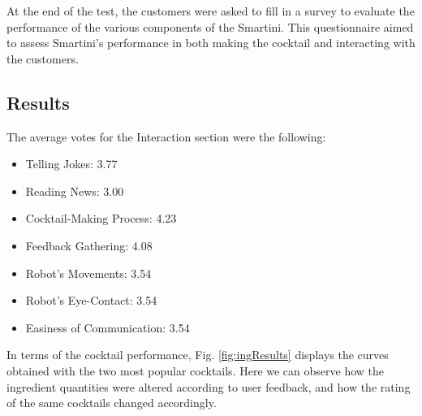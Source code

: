 \documentclass[conference]{IEEEtran}
\begin{document}
At the end of the test, the customers were asked to fill in a survey to evaluate the performance of the various components of the Smartini. This questionnaire aimed to assess Smartini's performance in both making the cocktail and interacting with the customers. 

\subsection{Results}

The average votes for the Interaction section were the following:

\begin{itemize}
\item 
Telling Jokes:  \hfill 3.77
\item 
Reading News:  \hfill 3.00
\item 
Cocktail-Making Process:  \hfill 4.23
\item 
Feedback Gathering:  \hfill 4.08
\item 
Robot's Movements:  \hfill 3.54
\item 
Robot's Eye-Contact:  \hfill 3.54
\item 
Easiness of Communication:  \hfill 3.54

\end{itemize}

In terms of the cocktail performance, Fig. \ref{fig:ingResults} displays the curves obtained with the two most popular cocktails. Here we can observe how the ingredient quantities were altered according to user feedback, and how the rating of the same cocktails changed accordingly. 
\end{document}
